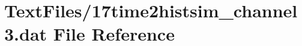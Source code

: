 \hypertarget{17time2histsim__channel3_8dat}{}\section{Text\+Files/17time2histsim\+\_\+channel3.dat File Reference}
\label{17time2histsim__channel3_8dat}
